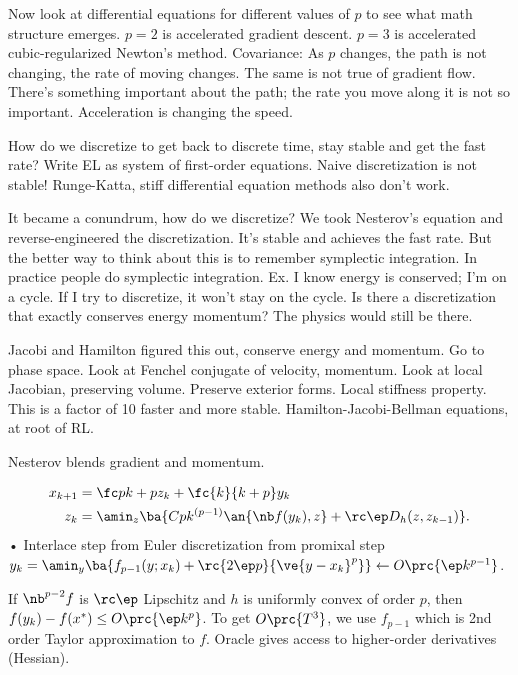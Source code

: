 Now look at differential equations for different values of $p$ to see what math structure emerges. $p=2$ is accelerated gradient descent. $p=3$ is accelerated cubic-regularized Newton's method. Covariance: As $p$ changes, the path is not changing, the rate of moving changes. 
The same is not true of gradient flow. There's something important about the path; the rate you move along it is not so important. Acceleration is changing the speed.

How do we discretize to get back to discrete time, stay stable and get the fast rate?
Write EL as system of first-order equations. %
Naive discretization is not stable!
Runge-Katta, stiff differential equation methods also don't work.

It became a conundrum, how do we discretize? We took Nesterov's equation and reverse-engineered the discretization. It's stable and achieves the fast rate. But the better way to think about this is to remember symplectic integration. In practice people do symplectic integration. Ex. I know energy is conserved; I'm on a cycle. If I try to discretize, it won't stay on the cycle. Is there a discretization that exactly conserves energy momentum? The physics would still be there.


Jacobi and Hamilton figured this out, conserve energy and momentum. Go to phase space. Look at Fenchel conjugate of velocity, momentum. Look at local Jacobian, preserving volume. Preserve exterior forms. Local stiffness property. This is a factor of 10 faster and  more stable. %
Hamilton-Jacobi-Bellman equations, at root of RL.

Nesterov blends gradient and momentum.

\begin{align}
x_{k+1} &= \fc p{k+p} z_k + \fc{k}{k+p}y_k\\
z_k &= \amin_{z}\ba{Cpk^{(p-1)} \an{\nb f(y_k), z}+\rc \ep D_h(z,z_{k-1})}.
\end{align}•
Interlace step from Euler discretization from promixal step $y_k = \amin_y \ba{f_{p-1} (y;x_k) + \rc{2\ep p}{\ve{y-x_k}^p}} \leftarrow O\prc{\ep k^{p-1}}$.

If $\nb^{p-2} f$ is $\rc\ep$ Lipschitz and $h$ is uniformly convex of order $p$, then $f(y_k) - f(x^*) \le O\prc{\ep k^p}$. To get $O\prc{T^3}$, we use $f_{p-1}$ which is 2nd order Taylor approximation to $f$. Oracle gives access to higher-order derivatives (Hessian).

